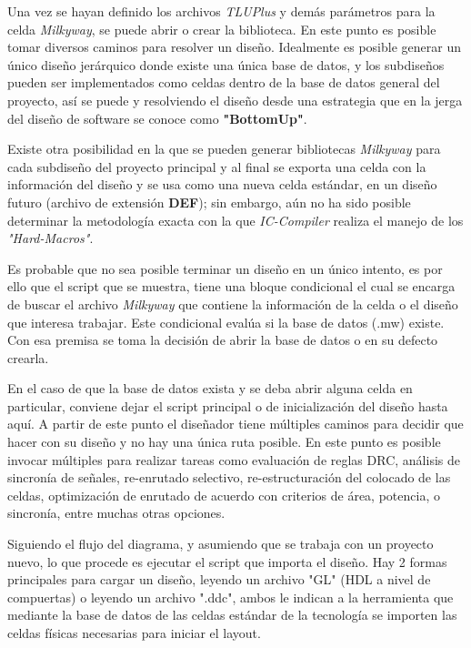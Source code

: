 Una vez se hayan definido los archivos \textit{TLUPlus} y demás parámetros para la celda \textit{Milkyway}, se puede abrir o crear la biblioteca. En este punto es posible tomar diversos caminos para resolver un diseño. Idealmente es posible generar un único diseño jerárquico donde existe una única base de datos, y los subdiseños pueden ser implementados como celdas dentro de la base de datos general del proyecto, así se puede y resolviendo el diseño desde una estrategia que en la jerga del diseño de software se conoce como \textbf{"BottomUp"}. 

Existe otra posibilidad en la que se pueden generar bibliotecas \textit{Milkyway} para cada subdiseño del proyecto principal y al final se exporta una celda con la información del diseño y se usa como una nueva celda estándar, en un diseño futuro (archivo de extensión \textbf{DEF}); sin embargo, aún no ha sido posible determinar la metodología exacta con la que \textit{IC-Compiler} realiza el manejo de los \textit{"Hard-Macros"}.

Es probable que no sea posible terminar un diseño en un único intento, es por ello que el script que se muestra, tiene una bloque condicional el cual se encarga de buscar el archivo \textit{Milkyway} que contiene la información de la celda o el diseño que interesa trabajar. Este condicional evalúa si la base de datos (.mw) existe. Con esa premisa se toma la decisión de abrir la base de datos o en su defecto crearla.

En el caso de que la base de datos exista y se deba abrir alguna celda en particular, conviene dejar el script principal o de inicialización del diseño hasta aquí. A partir de este punto el diseñador tiene múltiples caminos para decidir que hacer con su diseño y no hay una única ruta posible. En este punto es posible invocar múltiples para realizar tareas como evaluación de reglas DRC, análisis de sincronía de señales, re-enrutado selectivo, re-estructuración del colocado de las celdas, optimización de enrutado de acuerdo con criterios de área, potencia, o sincronía, entre muchas otras opciones.

Siguiendo el flujo del diagrama, y asumiendo que se trabaja con un proyecto nuevo, lo que procede es ejecutar el script que importa el diseño. Hay 2 formas principales para cargar un diseño, leyendo un archivo "GL" (HDL a nivel de compuertas) o leyendo un archivo ".ddc", ambos le indican a la herramienta que mediante la base de datos de las celdas estándar de la tecnología se importen las celdas físicas necesarias para iniciar el layout.

